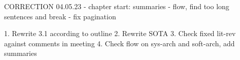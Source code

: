 CORRECTION 04.05.23
 - chapter start: summaries
 - flow, find too long sentences and break
 - fix pagination



1. Rewrite 3.1 according to outline
2. Rewrite SOTA
3. Check fixed lit-rev against comments in meeting
4. Check flow on sys-arch and soft-arch, add summaries